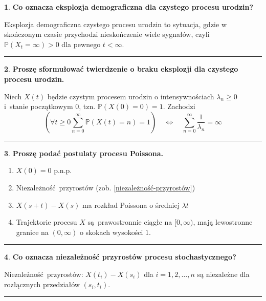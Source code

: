 \documentclass[
    twocolumn,
    twoside,
    fontsize=11pt,
    paper=A0,
    DIV=30
]{scrartcl}
\theoremstyle{definition}
\newtheorem{pytanie}{}
\theoremstyle{break}
\newenvironment{odpowiedź}{\vspace{-0.7em}}{\vspace{0.3em}\hrule}
\begin{document}
\begin{pytanie}
\textbf{Co oznacza eksplozja demograficzna dla czystego procesu urodzin?}
\end{pytanie}
\begin{odpowiedź}
    Eksplozja demograficzna czystego procesu urodzin to sytuacja,
    gdzie w skończonym czasie przychodzi nieskończenie wiele
    sygnałów, czyli $\mathbb{P}(X_t = \infty) > 0$ dla pewnego $t < \infty$.
\end{odpowiedź}


\begin{pytanie}
\textbf{Proszę sformułować twierdzenie o braku eksplozji dla czystego procesu urodzin.}
\end{pytanie}
\begin{odpowiedź}
    Niech $X(t)$ będzie czystym procesem urodzin
    o intensywnościach $\lambda_n \geq 0$ i~stanie początkowym 0,
    tzn. $\mathbb{P}(X(0)=0)=1$. Zachodzi \[
        \left(\forall t \geq 0 \sum_{n = 0}^\infty
        \mathbb{P}(X(t)=n)=1\right) \quad \iff \quad
        \sum_{n = 0}^\infty \frac 1 {\lambda_n} = \infty
    \] 
\end{odpowiedź}


\begin{pytanie}
\textbf{Proszę podać postulaty procesu Poissona.}
\end{pytanie}
\begin{odpowiedź}
    \begin{enumerate}
        \item $X(0) = 0$ p.n.p.
        \item Niezależność przyrostów (zob. \ref{niezależność-przyrostów})
        \item $X(s+t)-X(s)$ ma rozkład Poissona o średniej $\lambda t$
        \item Trajektorie procesu $X$ są prawostronnie ciągłe
            na $[0, \infty)$, mają lewostronne granice na $(0, \infty )$
            o skokach wysokości $1$.
    \end{enumerate}
\end{odpowiedź}


\begin{pytanie}
\textbf{Co oznacza niezależność przyrostów procesu stochastycznego?}
\end{pytanie}
\begin{odpowiedź} \label{niezależność-przyrostów}
    Niezależność przyrostów:
    $X(t_i)-X(s_i)$ dla $i=1,2,\ldots,n$
    są niezależne dla rozłącznych przedziałów $(s_i,t_i)$.
\end{odpowiedź}
\end{document}
